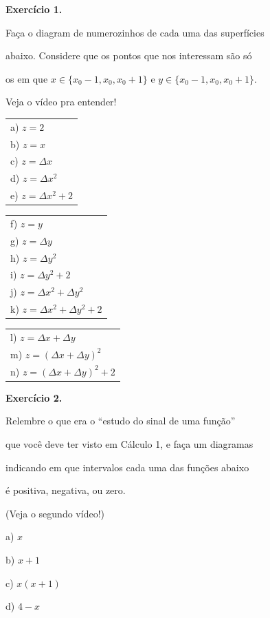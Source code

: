 \documentclass[oneside,12pt]{article}
\begin{document}
{\bf Exercício 1.}

Faça o diagram de numerozinhos de cada uma das superfícies

abaixo. Considere que os pontos que nos interessam são só

os em que $x∈\{x_0-1, x_0, x_0+1\}$ e $y∈\{x_0-1, x_0, x_0+1\}$.

Veja o vídeo pra entender!

\msk

\begin{tabular}[t]{l}
a) $z = 2$ \\
b) $z = x$ \\
c) $z = Δx$ \\
d) $z = Δx^2$ \\
e) $z = Δx^2 + 2$ \\
\end{tabular}
\msk
\begin{tabular}[t]{l}
f) $z = y$ \\
g) $z = Δy$ \\
h) $z = Δy^2$ \\
i) $z = Δy^2 + 2$ \\
j) $z = Δx^2+Δy^2$ \\
k) $z = Δx^2+Δy^2 + 2$ \\
\end{tabular}
\msk
\begin{tabular}[t]{l}
l) $z = Δx+Δy$ \\
m) $z = (Δx+Δy)^2$ \\
n) $z = (Δx+Δy)^2 + 2$ \\
\end{tabular}

\newpage


{\bf Exercício 2.}

Relembre o que era o ``estudo do sinal de uma função''

que você deve ter visto em Cálculo 1, e faça um diagramas

indicando em que intervalos cada uma das funções abaixo

é positiva, negativa, ou zero.

(Veja o segundo vídeo!)

\msk

a) $x$

b) $x+1$

c) $x(x+1)$

d) $4-x$
\end{document}
